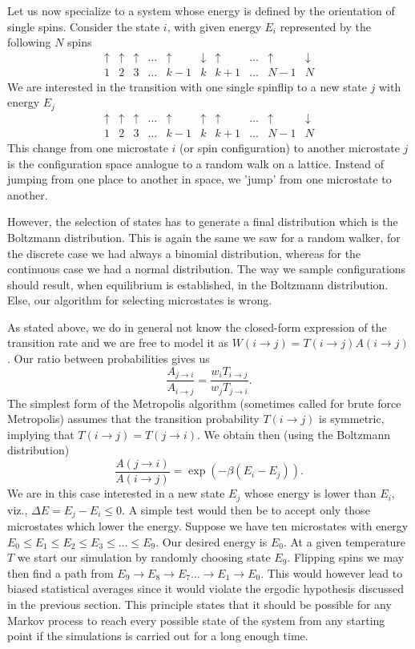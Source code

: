Let us now specialize to a system whose energy is defined by the orientation of single spins.
Consider the state $i$, with given energy $E_i$ represented by the following $N$ spins
\[
\begin{array}{cccccccccc}
\uparrow&\uparrow&\uparrow&\dots&\uparrow&\downarrow&\uparrow&\dots&\uparrow&\downarrow\\
1&2&3&\dots& k-1&k&k+1&\dots&N-1&N\end{array}
\]
We are interested in the transition with one single  spinflip to a new state $j$ with energy $E_j$
\[
\begin{array}{cccccccccc}
\uparrow&\uparrow&\uparrow&\dots&\uparrow&\uparrow&\uparrow&\dots&\uparrow&\downarrow\\
1&2&3&\dots& k-1&k&k+1&\dots&N-1&N\end{array}
\]
This change from one microstate $i$ (or spin configuration)  to another microstate $j$ is the
configuration space analogue to a random walk on a lattice. Instead of jumping from 
one place to another in space, we 'jump' from one microstate to another.

However, the selection of states has to generate a final distribution which is the
Boltzmann distribution. This is again the same we saw for a random walker, for the discrete case we had 
always a binomial distribution, whereas for the continuous case we had a normal distribution.
The way we sample configurations should result, when equilibrium is established, in the 
Boltzmann distribution. Else, our algorithm for selecting microstates is wrong.
 

As stated above, we do in general not know the closed-form expression of the transition rate and we are free to model it as
     $W(i\rightarrow j)=T(i\rightarrow j)A(i\rightarrow j)$.
Our ratio between probabilities gives us
\[ 
\frac{A_{j\rightarrow i}}{A_{i\rightarrow j}}= \frac{w_iT_{i\rightarrow j}}{w_jT_{j\rightarrow i}}.
\]
The simplest form of the Metropolis algorithm (sometimes called for brute force Metropolis) assumes that 
the transition probability $T(i\rightarrow j)$ is symmetric, implying that $T(i\rightarrow j)=T(j\rightarrow i)$.
We obtain then (using the Boltzmann distribution)
\[
\frac{A(j\rightarrow i)}{A(i\rightarrow j)}= \exp{(-\beta(E_i-E_j))} .
\]
We are in this case interested in a new state $E_j$ whose energy is lower than 
$E_i$, viz., $\Delta E = E_j-E_i \le 0$. A simple test would then be to accept only those
microstates which lower the energy.  
Suppose we have ten microstates with energy $E_0 \le E_1 \le E_2 \le E_3 \le \dots \le E_9$.
Our desired energy is $E_0$.
At a given temperature $T$ we start our simulation by randomly choosing state
$E_9$. Flipping spins we may then find a path from $E_9\rightarrow E_8 \rightarrow E_7 \dots \rightarrow E_1 \rightarrow E_0$. 
This would however lead to biased statistical averages since it would violate the ergodic hypothesis discussed
in the previous section. This principle states  that 
it should be possible for any Markov process to reach every possible state of the system
from any starting point if the simulations is carried out for a long enough time.

